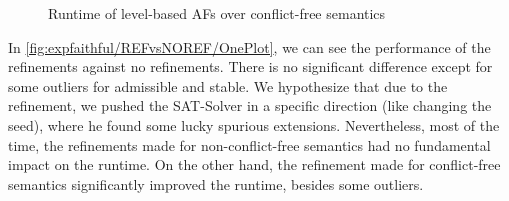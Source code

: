 \begin{figure}[H]
    \centering
    \caption{Runtime of level-based AFs over conflict-free semantics}
    \label{fig:expfaithful/REFvsNOREF/level-based}
\end{figure}

In \cref{fig:expfaithful/REFvsNOREF/OnePlot}, we can see the performance of the refinements against no refinements. There is no significant difference except for some outliers for admissible and stable. We hypothesize that due to the refinement, we pushed the SAT-Solver in a specific direction (like changing the seed), where he found some lucky spurious extensions. Nevertheless, most of the time, the refinements made for non-conflict-free semantics had no fundamental impact on the runtime. On the other hand, the refinement made for conflict-free semantics significantly improved the runtime, besides some outliers.

